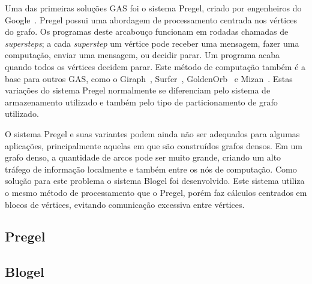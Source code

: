 \documentclass[conference]{IEEEtran}
\begin{document}
Uma das primeiras soluções GAS foi o sistema Pregel, criado por
engenheiros do Google~\cite{pregel}. Pregel possui uma abordagem de
processamento centrada nos vértices do grafo. Os programas deste
arcabouço funcionam em rodadas chamadas de {\em supersteps}; a cada
{\em superstep} um vértice pode receber uma mensagem, fazer uma
computação, enviar uma mensagem, ou decidir parar. Um programa acaba
quando todos os vértices decidem parar. Este método de computação também
é a base para outros GAS, como o Giraph~\cite{giraph},
Surfer~\cite{surfer}, GoldenOrb~\cite{goldenorb} e Mizan~\cite{mizan}.
Estas variações do sistema Pregel normalmente se diferenciam pelo
sistema de armazenamento utilizado e também pelo tipo de particionamento
de grafo utilizado.

O sistema Pregel e suas variantes podem ainda não ser adequados para
algumas aplicações, principalmente aquelas em que são construídos grafos
densos. Em um grafo denso, a quantidade de arcos pode ser muito grande,
criando um alto tráfego de informação localmente e também entre os nós
de computação. Como solução para este problema o sistema Blogel foi
desenvolvido. Este sistema utiliza o mesmo método de processamento que o
Pregel, porém faz cálculos centrados em blocos de vértices, evitando
comunicação excessiva entre vértices.

\subsection{Pregel}


\subsection{Blogel}
\end{document}

